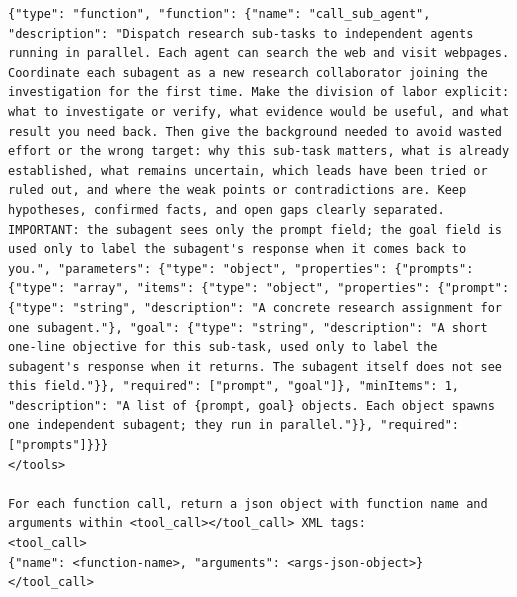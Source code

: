 \documentclass[table]{gtech}
\begin{document}
\begin{lstlisting}
{"type": "function", "function": {"name": "call_sub_agent", "description": "Dispatch research sub-tasks to independent agents running in parallel. Each agent can search the web and visit webpages. Coordinate each subagent as a new research collaborator joining the investigation for the first time. Make the division of labor explicit: what to investigate or verify, what evidence would be useful, and what result you need back. Then give the background needed to avoid wasted effort or the wrong target: why this sub-task matters, what is already established, what remains uncertain, which leads have been tried or ruled out, and where the weak points or contradictions are. Keep hypotheses, confirmed facts, and open gaps clearly separated. IMPORTANT: the subagent sees only the prompt field; the goal field is used only to label the subagent's response when it comes back to you.", "parameters": {"type": "object", "properties": {"prompts": {"type": "array", "items": {"type": "object", "properties": {"prompt": {"type": "string", "description": "A concrete research assignment for one subagent."}, "goal": {"type": "string", "description": "A short one-line objective for this sub-task, used only to label the subagent's response when it returns. The subagent itself does not see this field."}}, "required": ["prompt", "goal"]}, "minItems": 1, "description": "A list of {prompt, goal} objects. Each object spawns one independent subagent; they run in parallel."}}, "required": ["prompts"]}}}
</tools>

For each function call, return a json object with function name and arguments within <tool_call></tool_call> XML tags:
<tool_call>
{"name": <function-name>, "arguments": <args-json-object>}
</tool_call>
\end{lstlisting}
\end{document}
